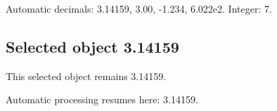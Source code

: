 \documentclass{article}
\begin{document}
Automatic decimals: 3.14159, 3.00, -1.234, 6.022e2. Integer: 7.

\begin{luanumbersexclude}
\section{Selected object 3.14159}
\label{sec:selected-3.14159}
This selected object remains 3.14159.
\end{luanumbersexclude}

Automatic processing resumes here: 3.14159.

\LuaNumbersOff
{}
\LuaNumbersOn
\end{document}
